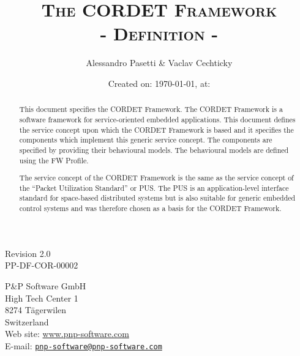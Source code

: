\documentclass[a4paper,10pt]{article}
\title{\textsc{The CORDET Framework} \\ \textsc{- Definition -}}
\author{Alessandro Pasetti \& Vaclav Cechticky}
\date{Created on: \today{}, at: \currenttime{}}
\newcommand{\docIssue}{2.0}						%
\newcommand{\docRefNumber}{PP-DF-COR-00002}		%
\begin{document}
\maketitle

\begin{center}
Revision \docIssue{}\\
\docRefNumber{}
\end{center}

\vspace{1cm}

\begin{center}
P\&P Software GmbH \\
High Tech Center 1 \\
8274 T\"{a}gerwilen \\
Switzerland \\
\vspace{2mm}
Web site: \url{www.pnp-software.com}\\
E-mail: \href{mailto:pnp-software@pnp-software.com}{\nolinkurl{pnp-software@pnp-software.com}} 
\end{center}

\vspace{1.2cm}

\begin{table}[ht]
\begin{center}
\begin{tabular}{p{11.7cm}}
\\
\hline
\end{tabular}
\end{center}
\end{table}
\begin{abstract}
This document specifies the CORDET Framework. The CORDET Framework is a software framework for service-oriented embedded applications. This document defines the service concept upon which the CORDET Framework is based and it specifies the components which implement this generic service concept. The components are specified by providing their behavioural models. The behavioural models are defined using the FW Profile.
\par
The service concept of the CORDET Framework is the same as the service concept of the “Packet Utilization Standard” or PUS. The PUS is an application-level interface standard for space-based distributed systems but is also suitable for generic embedded control systems and was therefore chosen as a basis for the CORDET Framework.
\end{abstract}
\begin{table}[ht]
\begin{center}
\begin{tabular}{p{11.7cm}}
\\
\hline
\end{tabular}
\end{center}
\end{table}
\end{document}
